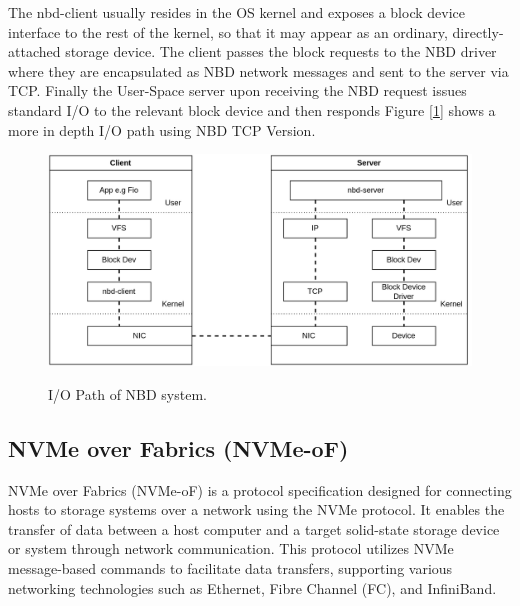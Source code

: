 \documentclass[nonacm,sigplan]{acmart}
\begin{document}
\par The nbd-client usually resides in the OS kernel and exposes a block device interface to the rest of the kernel, so that it may appear as an ordinary, directly-attached storage device. The client passes the block requests to the NBD driver where they are encapsulated as NBD network messages and sent to the server via TCP. Finally the User-Space server upon receiving the NBD request issues standard I/O to the relevant block device and then responds Figure [\ref{fig:nbd_path2}] shows a more in depth I/O path using NBD TCP Version. 
\begin{figure}[h]
    \includegraphics[scale=0.18]{figures/nbd-path2.png}\\
    \caption{I/O Path of NBD system.}
    \label{fig:nbd_path2}
  \end{figure}

\subsection{NVMe over Fabrics (NVMe-oF)}
NVMe over Fabrics (NVMe-oF) is a protocol specification designed for connecting
hosts to storage systems over a network using the NVMe protocol. It enables the
transfer of data between a host computer and a target solid-state storage device
or system through network communication. This protocol utilizes NVMe
message-based commands to facilitate data transfers, supporting various
networking technologies such as Ethernet, Fibre Channel (FC), and InfiniBand.
\end{document}
